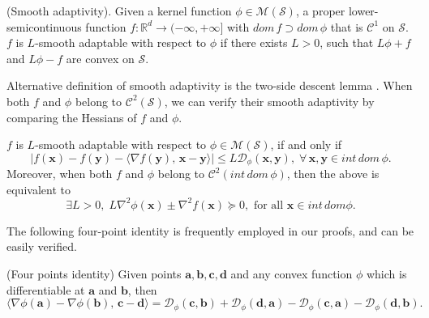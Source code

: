 \documentclass[twoside,11pt]{article}
\newcommand{\R}{\mathbb R}
\newcommand{\cC}{\mathcal C}
\newcommand{\cD}{\mathcal D}
\newcommand{\cM}{\mathcal M}
\newcommand{\cS}{\mathcal S}
\def\inprod#1#2{\langle#1,\,#2\rangle}
\def\va{{\bm{a}}}
\def\vb{{\bm{b}}}
\def\vc{{\bm{c}}}
\def\vd{{\bm{d}}}
\def\vx{{\bm{x}}}
\def\vy{{\bm{y}}}
\begin{document}
\begin{definition}\label{relative-smooth-def}
 (Smooth adaptivity). Given a kernel function $\phi\in\cM(\cS)$, 
 a proper lower-semicontinuous function $f:\R^d\rightarrow(-\infty,+\infty]$ with $dom\,f\supset dom\,\phi $ that  is $\cC^1$ on $\cS$. $f$ is $L$-smooth adaptable with respect to $\phi$ if there exists $L>0$, such that $L\phi+f$ and $L\phi-f$ are convex on $\cS$.
\end{definition}
Alternative definition of smooth adaptivity is the two-side descent lemma \cite[Lemma 2.1]{bolte2018first}. When both $f$ and $\phi$ belong to $\cC^2(\cS)$, we can verify their smooth adaptivity by comparing the Hessians of $f$ and $\phi$.
\begin{lemma}\label{two-side-descent}
$f$ is $L$-smooth adaptable with respect to $\phi\in\cM(\cS)$, if and only if 
\[
|f(\vx)-f(\vy)-\inprod{\nabla f(\vy)}{\vx-\vy}|\leq L\cD_\phi(\vx,\vy),\;\forall\,\vx,\vy\in int\,dom\,\phi.
\]
Moreover, when both $f$ and $\phi$ {belong to} $\cC^2(int\,dom\,\phi)$, then the above is equivalent to
\[
\exists L>0,\;L \nabla^2\phi(\vx){\pm}\nabla^2f(\vx) \succeq 0, \text { for all } \vx \in int\,dom\phi.
\]
\end{lemma}
The following four-point identity is frequently employed in our proofs, and can be easily verified.
\begin{lemma}(Four points identity) 
Given points $\va,\vb,\vc,\vd$ and any convex function $\phi$ which is differentiable at $\va$ and $\vb$, then
\[
\inprod{\nabla\phi(\va)-\nabla\phi(\vb)}{\vc-\vd}=\cD_\phi(\vc,\vb)+\cD_\phi(\vd,\va)-\cD_\phi(\vc,\va)-\cD_\phi(\vd,\vb).
\]
\label{four-point-identity}
\end{lemma}
\end{document}
